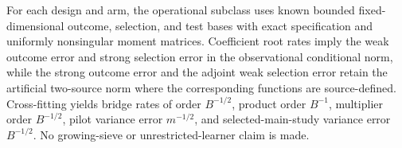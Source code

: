 For each design and arm, the operational subclass uses known bounded fixed-dimensional outcome, selection, and test bases with exact specification and uniformly nonsingular moment matrices. Coefficient root rates imply the weak outcome error and strong selection error in the observational conditional norm, while the strong outcome error and the adjoint weak selection error retain the artificial two-source norm where the corresponding functions are source-defined. Cross-fitting yields bridge rates of order \(B^{-1/2}\), product order \(B^{-1}\), multiplier order \(B^{-1/2}\), pilot variance error \(m^{-1/2}\), and selected-main-study variance error \(B^{-1/2}\). No growing-sieve or unrestricted-learner claim is made.